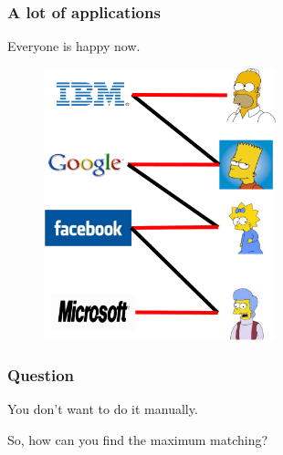 \documentclass[hyperref={pdfpagelabels=false}]{beamer}
\begin{document}
\frame
{
	\frametitle{A lot of applications}
	Everyone is happy now.
	
	\begin{figure}[htb]
	\centering
	\includegraphics[width=0.6\textwidth]{figures/mc2.pdf}
	\end{figure}
}

\frame
{
	\frametitle{Question}
	
	\huge{You don't want to do it manually.}
	
	\bigskip
	
	\huge{So, how can you find the maximum matching?}
	
}
\end{document}
